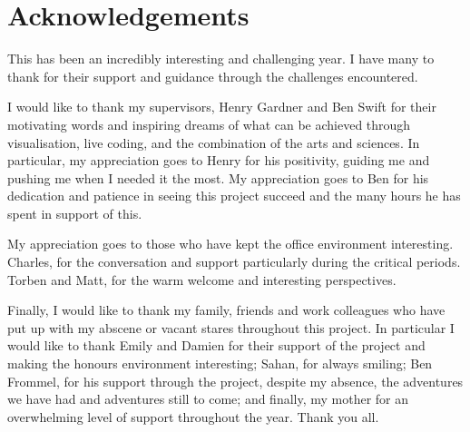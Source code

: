 
\chapter*{Acknowledgements}

This has been an incredibly interesting and challenging year. I have many to thank for their support and guidance through the challenges encountered.

I would like to thank my supervisors, Henry Gardner and Ben Swift for their motivating words and inspiring dreams of what can be achieved through visualisation, live coding, and the combination of the arts and sciences. In particular, my appreciation goes to Henry for his positivity, guiding me and pushing me when I needed it the most. My appreciation goes to Ben for his dedication and patience in seeing this project succeed and the many hours he has spent in support of this.

My appreciation goes to those who have kept the office environment interesting. Charles, for the conversation and support particularly during the critical periods. Torben and Matt, for the warm welcome and interesting perspectives. 

Finally, I would like to thank my family, friends and work colleagues who have put up with my abscene or vacant stares throughout this project. In particular I would like to thank Emily and Damien for their support of the project and making the honours environment interesting; Sahan, for always smiling; Ben Frommel, for his support through the project, despite my absence, the adventures we have had and adventures still to come; and finally, my mother for an overwhelming level of support throughout the year. Thank you all.
